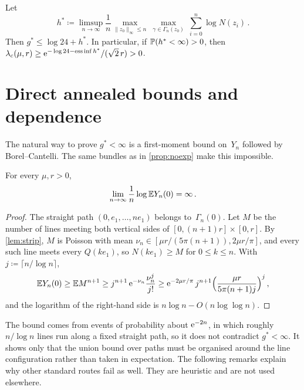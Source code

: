 \documentclass[11pt,letterpaper]{article}
\begin{document}
\begin{corollary}
\label{cor:greedy}
Let
\begin{equation*}
  h^*\coloneqq\limsup_{n\to\infty}\frac1n\max_{\lVert z_0\rVert_\infty\le n}\ \max_{\gamma\in\Gamma_n(z_0)}\ \sum_{i=0}^n\log N(z_i)\,.
\end{equation*}
Then $g^*\le\log24+h^*$. In particular, if $\P(h^*<\infty)>0$, then $\lambda_c(\mu,r)\ge\e^{-\log24-\operatorname{ess\,inf}h^*}/(\sqrt2\,r)>0$.
\end{corollary}

\section{Direct annealed bounds and dependence}
\label{sec:obstacles}

The natural way to prove $g^*<\infty$ is a first-moment bound on~$Y_n$ followed by Borel--Cantelli. The same bundles as in \cref{prop:noexp} make this impossible.

\begin{proposition}
\label{prop:annealed}
For every $\mu,r>0$,
\begin{equation*}
  \lim_{n\to\infty}\frac1n\log\E Y_n(0)=\infty\,.
\end{equation*}
\end{proposition}

\begin{proof}
The straight path $(0,e_1,\dots,ne_1)$ belongs to~$\Gamma_n(0)$. Let $M$ be the number of lines meeting both vertical sides of $[0,(n+1)r]\times[0,r]$. By \cref{lem:strip}, $M$ is Poisson with mean $\nu_n\in[\mu r/(5\pi(n+1)),2\mu r/\pi]$, and every such line meets every $Q(ke_1)$, so $N(ke_1)\ge M$ for $0\le k\le n$. With $j\coloneqq\lceil n/\log n\rceil$,
\begin{equation*}
  \E Y_n(0)\ge\E M^{n+1}\ge j^{n+1}\,\e^{-\nu_n}\frac{\nu_n^j}{j!}\ge\e^{-2\mu r/\pi}\,j^{n+1}\Bigl(\frac{\mu r}{5\pi(n+1)j}\Bigr)^j\,,
\end{equation*}
and the logarithm of the right-hand side is $n\log n-O(n\log\log n)$.
\end{proof}

The bound comes from events of probability about $\e^{-2n}$, in which roughly $n/\log n$ lines run along a fixed straight path, so it does not contradict $g^*<\infty$. It shows only that the union bound over paths must be organised around the line configuration rather than taken in expectation. The following remarks explain why other standard routes fail as well. They are heuristic and are not used elsewhere.
\end{document}
